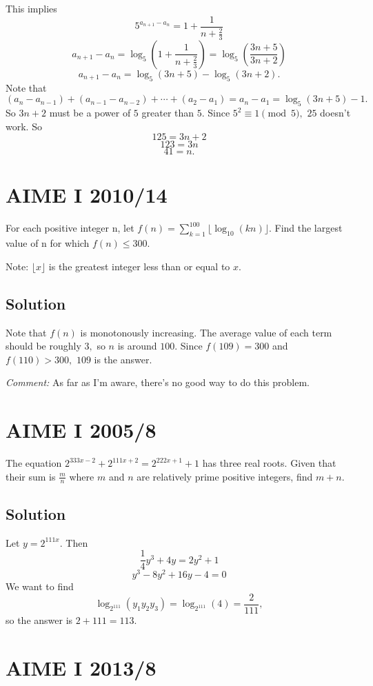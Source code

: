 \documentclass{article}
\begin{document}
This implies
    \[5^{a_{n+1}-a_n}=1+\frac{1}{n+\frac{2}{3}}\]
    \[a_{n+1}-a_n=\log_5(1+\frac{1}{n+\frac{2}{3}})=\log_5(\frac{3n+5}{3n+2})\]
    \[a_{n+1}-a_n=\log_5(3n+5)-\log_5(3n+2).\]
    Note that $(a_{n}-a_{n-1})+(a_{n-1}-a_{n-2})+\cdots+(a_{2}-a_{1})=a_n-a_1=\log_5(3n+5)-1.$ So $3n+2$ must be a power of $5$ greater than $5.$ Since $5^2\equiv 1\pmod{5},$ $25$ doesn't work. So
    \[125=3n+2\]
    \[123=3n\]
    \[41=n.\]

\pagebreak\section{AIME I 2010/14}

For each positive integer n, let $f(n) = \sum_{k = 1}^{100} \lfloor \log_{10} (kn) \rfloor$. Find the largest value of n for which $f(n) \le 300$.

Note: $\lfloor x \rfloor$ is the greatest integer less than or equal to $x$.

\subsection{Solution}

Note that $f(n)$ is monotonously increasing. The average value of each term should be roughly $3,$ so $n$ is around $100.$ Since $f(109)=300$ and $f(110)>300,$ $109$ is the answer.

\textit{Comment:} As far as I'm aware, there's no good way to do this problem.

\pagebreak\section{AIME I 2005/8}

The equation $2^{333x-2} + 2^{111x+2} = 2^{222x+1} + 1$ has three real roots. Given that their sum is $\frac mn$ where $m$ and $n$ are relatively prime positive integers, find $m+n.$

\subsection{Solution}

Let $y=2^{111x}.$ Then
    \[\frac{1}{4}y^3+4y=2y^2+1\]
    \[y^3-8y^2+16y-4=0\]
    We want to find
    \[\log_{2^{111}}({y_1y_2y_3})=\log_{2^{111}}({4})=\frac{2}{111},\]
    so the answer is $2+111=113.$

\pagebreak\section{AIME I 2013/8}
\end{document}
